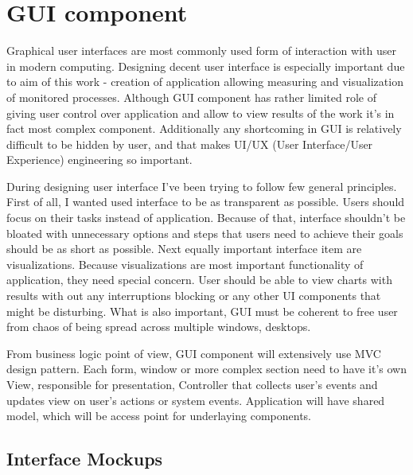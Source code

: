 
%


\section{GUI component}
\label{sec:arch_gui}

Graphical user interfaces are most commonly used form of interaction with user in modern computing. Designing decent
user interface is especially important due to aim of this work - creation of application allowing measuring and
visualization of monitored processes. Although GUI component has rather limited role of giving user control over
application and allow to view results of the work it's in fact most complex component. Additionally any shortcoming in
GUI is relatively difficult to be hidden by user, and that makes UI/UX (User Interface/User Experience) engineering so
important.

During designing user interface I've been trying to follow few general principles. First of all, I wanted used
interface to be as transparent as possible. Users should focus on their tasks instead of application. Because of that,
interface shouldn't be bloated with unnecessary options and steps that users need to achieve their goals should be as
short as possible. Next equally important interface item are visualizations. Because visualizations are most important
functionality of application, they need special concern. User should be able to view charts with results with out
any interruptions blocking or any other UI components that might be disturbing. What is also important, GUI must be
coherent to free user from chaos of being spread across multiple windows, desktops. 

From business logic point of view, GUI component will extensively use MVC design pattern\cite{gamma1995}. Each form,
window or more complex section need to have it's own View, responsible for presentation, Controller that collects
user's events and updates view on user's actions or system events. Application will have shared model, which will be
access point for underlaying components.
 


\subsection{Interface Mockups}


